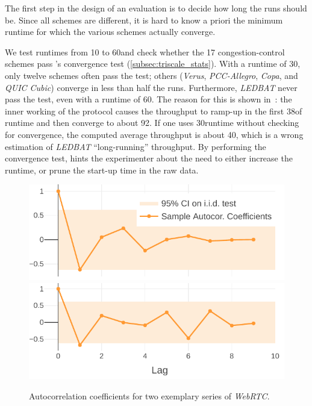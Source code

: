 The first step in the design of an evaluation is to decide how long the runs should be.
Since all schemes are different, it is hard to know a priori the minimum runtime for which the various schemes actually converge.

We test runtimes from 10 to 60\s and check whether the 17 congestion-control schemes pass \triscale's convergence test (\cref{subsec:triscale_stats}).
With a runtime of 30\s, only twelve schemes often pass the test; others (\textit{Verus}, \textit{PCC-Allegro}, \textit{Copa}, and \textit{QUIC Cubic}) converge in less than half the runs.
Furthermore, \textit{LEDBAT} never pass the test, even with a runtime of 60\s.
The reason for this is shown in~: the inner working of the protocol causes the throughput to ramp-up in the first 38\s of runtime and then converge to about 92\mbps.
If one uses 30\s runtime without checking for convergence, the computed average throughput is about 40\mbps, which is a wrong estimation of \textit{LEDBAT} ``long-running'' throughput.
By performing the convergence test, \triscale hints the experimenter about the need to either increase the runtime, or prune the start-up time in the raw data.

\begin{figure}
    \centering
   	\href{\triscalefig{Figure-5}}{
    \includegraphics[scale=1]{Figures/plot_webrtc_autocorr_passed.pdf}}\\
   	\href{\triscalefig{Figure-5}}{
    \includegraphics[scale=1]{Figures/plot_webrtc_autocorr_failed.pdf}}
    \caption{Autocorrelation coefficients for two exemplary series of \textit{WebRTC}.
    }
    \label{fig:webrtc_autocorr}
\end{figure}


